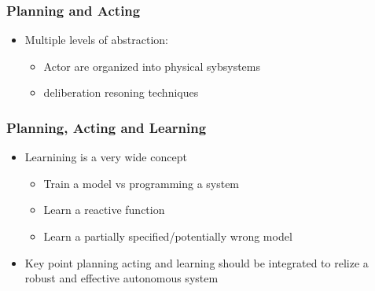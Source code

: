 \documentclass[a4paper]{article}
\theoremstyle{definition}
\begin{document}
\subsubsection{Planning and Acting}
\begin{itemize}
    \item Multiple levels of abstraction:
    \begin{itemize}
        \item Actor are organized into physical sybsystems 
        \item deliberation resoning techniques
    \end{itemize}
\end{itemize}
\subsubsection{Planning, Acting and Learning}
\begin{itemize}
    \item Learnining is a very wide concept
    \begin{itemize}
        \item Train a model vs programming a system 
        \item Learn a reactive function 
        \item Learn a partially specified/potentially wrong model
    \end{itemize}
    \item Key point planning acting and learning should be integrated to relize a robust and effective autonomous system
\end{itemize}
\end{document}
